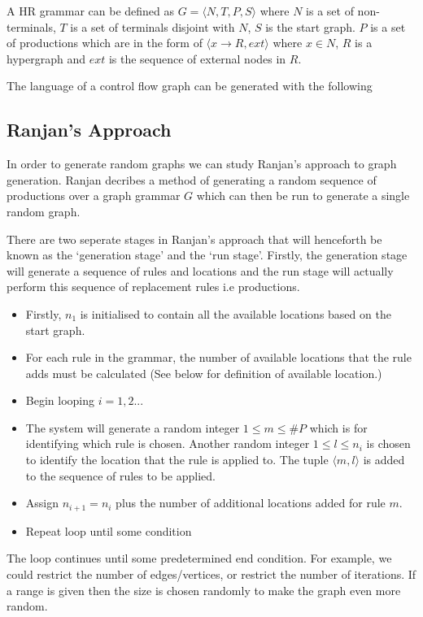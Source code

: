     A HR grammar can be defined as $G = \langle N, T, P, S \rangle$ where $N$ is a set of non-terminals, $T$ is a set of terminals disjoint with $N$, $S$ is the start graph. $P$ is a set of productions which are in the form of $\langle x \to R, ext \rangle$ where $x \in N$, $R$ is a hypergraph and $ext$ is the sequence of external nodes in $R$.

    The language of a control flow graph can be generated with the following
    

\subsection{Ranjan's Approach}
  In order to generate random graphs we can study Ranjan's approach to graph generation. Ranjan\cite{Ranjan} decribes a method of generating a random sequence of productions over a graph grammar $G$ which can then be run to generate a single random graph.

  There are two seperate stages in Ranjan's approach that will henceforth be known as the `generation stage' and the `run stage'. Firstly, the generation stage will generate a sequence of rules and locations and the run stage will actually perform this sequence of replacement rules i.e productions.

  \begin{itemize}
  \item Firstly, $n_1$ is initialised to contain all the available locations based on the start graph.
  \item For each rule in the grammar, the number of available locations that the rule adds must be calculated (See below for definition of available location.)
  \item Begin looping $i = 1,2...$
  \item The system will generate a random integer $1 \leq m \leq \#P$ which is for identifying which rule is chosen. Another random integer $1 \leq l \leq n_i$ is chosen to identify the location that the rule is applied to. The tuple $\langle m,l \rangle$ is added to the sequence of rules to be applied.
  \item Assign $n_{i+1} = n_i$ plus the number of additional locations added for rule $m$. 
  \item Repeat loop until some condition
  \end{itemize}

  The loop continues until some predetermined end condition. For example, we could restrict the number of edges/vertices, or restrict the number of iterations. If a range is given then the size is chosen randomly to make the graph even more random.

